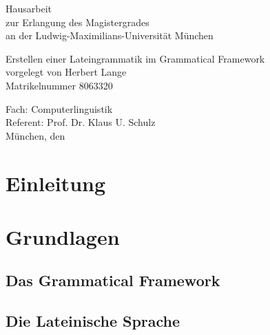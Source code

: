 \documentclass[fontsize=12pt,abstract=on,titlepage,bibliography=totoc,ngerman,listof=totoc]{scrreprt}
\begin{document}
\setcounter{tocdepth}{2}
\date{31.10.2013}
\makeatletter
\begin{titlepage}
{\sffamily
  \begin{center}
    \vspace{4cm}
    \begin{huge}
      Hausarbeit \\
      zur Erlangung des Magistergrades \\
      an der Ludwig-Maximilians-Universität München \\[3cm]
    \end{huge}
    {\Huge Erstellen einer Lateingrammatik im Grammatical Framework \\[4cm] }
    {\LARGE vorgelegt von Herbert Lange \\ Matrikelnummer 8063320 \\[3.5cm] }
  \end{center}
  \parindent0mm
  \begin{huge} 
    Fach: Computerlinguistik  \\[0.5cm]
    Referent: Prof. Dr. Klaus U. Schulz \\[0.5cm]
    München, den \@date 
  \end{huge}
}
\end{titlepage}

\makeatother
\tableofcontents
\clearpage
\setcounter{page}{1}
\chapter{Einleitung}
\label{chap:einleitung}

\chapter{Grundlagen}
\label{chap:grundlagen}
\section{Das Grammatical Framework}
\label{sec:gf}

\pagebreak
\FloatBarrier
\section{Die Lateinische Sprache}
\label{sec:latein}

\pagebreak
\FloatBarrier
\end{document}
